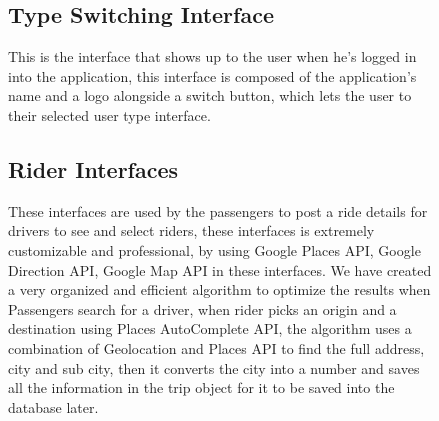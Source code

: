 \begin{figure}
\hspace*{\fill}
\hfill 
{}
\hspace*{\fill}
\end{figure}

\begin{figure}
\centering
{}
\end{figure}

\begin{figure}
\subsection{Type Switching Interface}
This is the interface that shows up to the user when he’s logged in into the application, this interface is composed of the application’s name and a logo alongside a switch button, which lets the user to their selected user type interface.
\begin{center}
\end{center}
\subsection{Rider Interfaces}
These interfaces are used by the passengers to post a ride details for drivers to see and select riders, these interfaces is extremely customizable and professional, by using Google Places API, Google Direction API, Google Map API in these interfaces. We have created a very organized and efficient algorithm to optimize the results when Passengers search for a driver, when rider picks an origin and a destination using Places AutoComplete API, the algorithm uses a combination of Geolocation and Places API to find the full address, city and sub city, then it converts the city into a number and saves all the information in the trip object for it to be saved into the database later.
\end{figure}

\begin{figure} 
\hspace*{\fill}
\hfill 
{}
\hspace*{\fill}
\end{figure}

